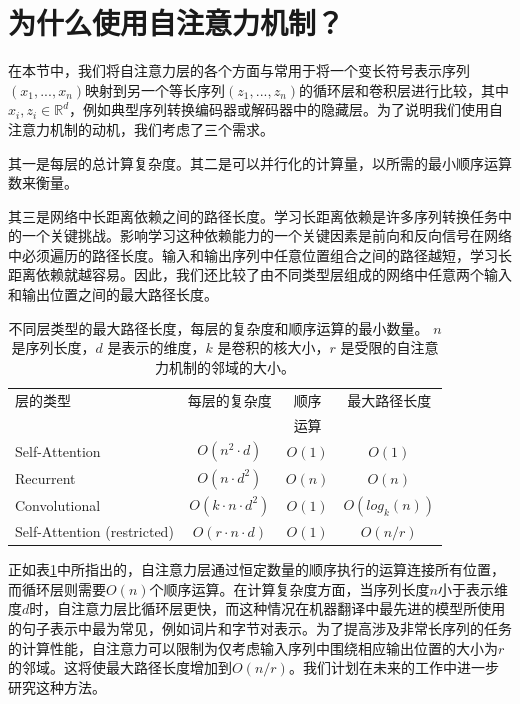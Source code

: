 \documentclass[lang=cn,a4paper,newtx]{elegantpaper}
\begin{document}
\section{为什么使用自注意力机制？}

在本节中，我们将自注意力层的各个方面与常用于将一个变长符号表示序列$(x_1, ..., x_n)$映射到另一个等长序列$(z_1, ..., z_n)$的循环层和卷积层进行比较，其中$x_i, z_i \in \mathbb{R}^d$，例如典型序列转换编码器或解码器中的隐藏层。为了说明我们使用自注意力机制的动机，我们考虑了三个需求。

其一是每层的总计算复杂度。其二是可以并行化的计算量，以所需的最小顺序运算数来衡量。

其三是网络中长距离依赖之间的路径长度。学习长距离依赖是许多序列转换任务中的一个关键挑战。影响学习这种依赖能力的一个关键因素是前向和反向信号在网络中必须遍历的路径长度。输入和输出序列中任意位置组合之间的路径越短，学习长距离依赖就越容易。因此，我们还比较了由不同类型层组成的网络中任意两个输入和输出位置之间的最大路径长度。

\begin{table}[t]
\caption{
  不同层类型的最大路径长度，每层的复杂度和顺序运算的最小数量。 $n$ 是序列长度，$d$ 是表示的维度，$k$ 是卷积的核大小，$r$ 是受限的自注意力机制的邻域的大小。}
\label{tab:op_complexities}
\begin{center}
\vspace{-1mm}

\begin{tabular}{lccc}
\toprule
层的类型   & 每层的复杂度 & 顺序 & 最大路径长度  \\
           &             & 运算 &   \\
\hline
\rule{0pt}{2.0ex}Self-Attention & $O(n^2 \cdot d)$ & $O(1)$ & $O(1)$ \\
Recurrent & $O(n \cdot d^2)$ & $O(n)$ & $O(n)$ \\

Convolutional & $O(k \cdot n \cdot d^2)$ & $O(1)$ & $O(log_k(n))$ \\
Self-Attention (restricted)& $O(r \cdot n \cdot d)$ & $O(1)$ & $O(n/r)$ \\

\bottomrule
\end{tabular}
\end{center}
\end{table}

正如表\ref{tab:op_complexities}中所指出的，自注意力层通过恒定数量的顺序执行的运算连接所有位置，而循环层则需要$O(n)$个顺序运算。在计算复杂度方面，当序列长度$n$小于表示维度$d$时，自注意力层比循环层更快，而这种情况在机器翻译中最先进的模型所使用的句子表示中最为常见，例如词片和字节对表示。为了提高涉及非常长序列的任务的计算性能，自注意力可以限制为仅考虑输入序列中围绕相应输出位置的大小为$r$的邻域。这将使最大路径长度增加到$O(n/r)$。我们计划在未来的工作中进一步研究这种方法。
\end{document}
